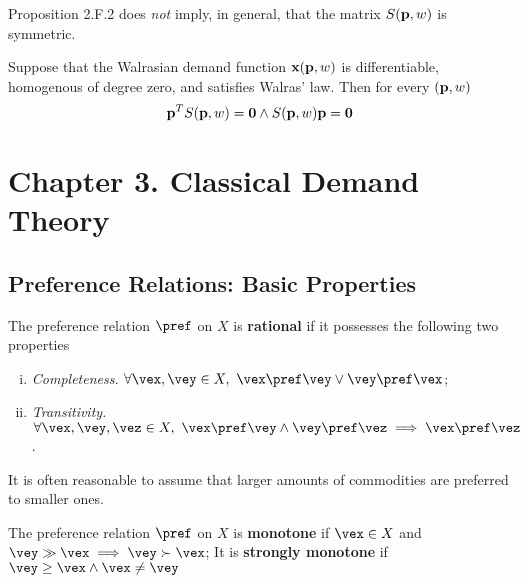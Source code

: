 \documentclass{article}
\begin{document}
 			\begin{remark}
 				Proposition 2.F.2 does \emph{not} imply, in general, that the matrix $S(\textbf{p}, w)$ is symmetric.
 			\end{remark}
 			
 			\begin{proposition}[2.F.3]
 				Suppose that the Walrasian demand function $\textbf{x}(\textbf{p}, w)$ is differentiable, homogenous of degree zero, and satisfies Walras' law. Then for every $(\textbf{p}, w)$
 				\begin{equation}
 					\textbf{p}^T S(\textbf{p}, w) = \textbf{0} \land S(\textbf{p}, w) \textbf{p} = \textbf{0}
 				\end{equation}
 			\end{proposition}
 	
 	\section{Chapter 3. Classical Demand Theory}
 		\subsection{Preference Relations: Basic Properties}
 			\begin{definition}[3.B.1]
 				The preference relation $\pref$ on $X$ is \textbf{rational} if it possesses the following two properties
 				\begin{enumerate}[(i)]
 					\item \emph{Completeness.} $\forall \vex, \vey \in X,\ \vex \pref \vey \lor \vey \pref \vex$;
 					\item \emph{Transitivity.} $\forall \vex, \vey, \vez \in X,\ \vex \pref \vey \land \vey \pref \vez \implies \vex \pref \vez$.
 				\end{enumerate}
 			\end{definition}
 			
 			\begin{remark}
 				It is often reasonable to assume that larger amounts of commodities are preferred to smaller ones.
 			\end{remark}
 			
 			\begin{definition}[3.B.2]
 				The preference relation $\pref$ on $X$ is \textbf{monotone} if $\vex \in X$ and $\vey \gg \vex \implies \vey \succ \vex$; It is \textbf{strongly monotone} if $\vey \geq \vex \land \vex \neq \vey$
 			\end{definition}
 			
\end{document}
